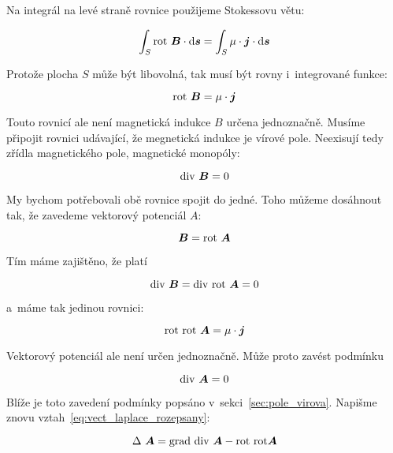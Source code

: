Na integrál na levé straně rovnice použijeme Stokessovu větu:

\begin{equation}
\int_{S} \mathrm{rot} \ \boldsymbol{B} \cdot \mathrm{d}\boldsymbol{s} = \int_S \mu \cdot \boldsymbol{j} \cdot \mathrm{d}\boldsymbol{s}
\end{equation}

Protože plocha \(S\) může být libovolná, tak musí být rovny i~integrované funkce:

\begin{equation}
\mathrm{rot} \ \boldsymbol{B} = \mu \cdot \boldsymbol{j}
\end{equation}

Touto rovnicí ale není magnetická indukce \(B\) určena jednoznačně. Musíme připojit rovnici udávající, že megnetická indukce je vírové pole. Neexisují tedy zřídla magnetického pole, magnetické monopóly:

\begin{equation}
\mathrm{div} \ \boldsymbol{B} = 0
\end{equation}

My bychom potřebovali obě rovnice spojit do jedné. Toho můžeme dosáhnout tak, že zavedeme vektorový potenciál \(A\):

\begin{equation}
\boldsymbol{B} = \mathrm{rot} \ \boldsymbol{A}
\end{equation}

Tím máme zajištěno, že platí

\begin{equation}
\diverg \ \vect{B} = \diverg \ \rot \ \vect{A} = 0
\end{equation}

a~máme tak jedinou rovnici:

\begin{equation}
\mathrm{rot} \ \mathrm{rot} \ \boldsymbol{A} = \mu \cdot \boldsymbol{j}
\end{equation}

Vektorový potenciál ale není určen jednoznačně. Může proto zavést podmínku 

\begin{equation}
\mathrm{div} \ \boldsymbol{A} = 0
\end{equation}

Blíže je toto zavedení podmínky popsáno v~sekci~\ref{sec:pole_virova}. Napišme znovu vztah~\eqref{eq:vect_laplace_rozepsany}:

\begin{equation}
\Delta \ \vect{A} = \grad \ \diverg \ \vect{A} - \rot \ \rot \vect{A} 
\end{equation}

